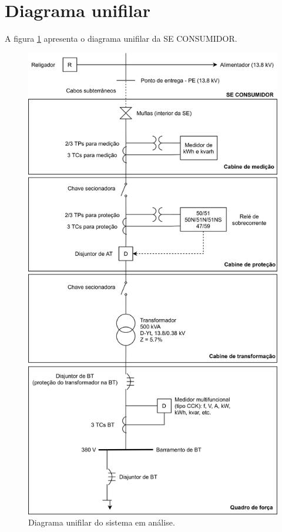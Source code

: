 \section{Diagrama unifilar}

A figura \ref{fig:unifilar} apresenta o diagrama unifilar da SE CONSUMIDOR.

\begin{figure}[H] 
    \centering
    \includegraphics[height=0.8\textheight]{images/unifilar.jpg}
    \caption{Diagrama unifilar do sistema em análise.}
    \label{fig:unifilar}
\end{figure}